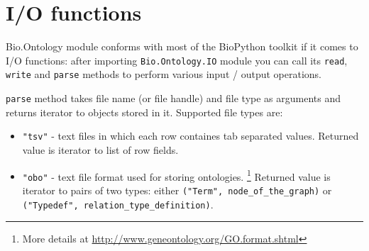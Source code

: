 \documentclass{report}
\begin{document}
\section{I/O functions}

Bio.Ontology module conforms with most of the BioPython toolkit if it comes to
I/O functions: after importing \verb|Bio.Ontology.IO| module you can call its
\verb|read|, \verb|write| and \verb|parse| methods to
perform various input / output operations.

\verb|parse| method takes file name (or file handle) and file type as arguments
and returns iterator to objects stored in it.
Supported file types are:
\begin{itemize}
\item \verb|"tsv"| - text files in which each row containes tab separated values. Returned
value is iterator to list of row fields.
\item \verb|"obo"| - text file format used for storing ontologies. \footnote{More details at
\url{http://www.geneontology.org/GO.format.shtml}}
Returned value is iterator to pairs of two types: either
\verb|("Term", node_of_the_graph)| or \verb|("Typedef", relation_type_definition)|.
\end{itemize}
\end{document}
